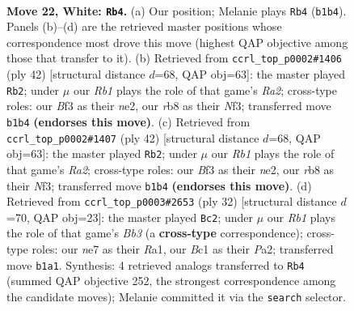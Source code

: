 \documentclass[11pt]{article}
\begin{document}
\clearpage

\begin{figure}[p]\centering
\begin{subfigure}{0.46\textwidth}\centering
\resizebox{\linewidth}{!}{%
\newchessgame
\chessboard[
  setfen={1rb2r1k/p3np2/1p2pnpp/2P5/2P5/N3PB1P/P4PP1/1RB1R1K1 w - - 2 22},
  showmover=false,
  pgfstyle=straightmove, color=movearrow, markmove={b1-b4}
]}
\caption{}
\end{subfigure}\hfill
\begin{subfigure}{0.46\textwidth}\centering
\resizebox{\linewidth}{!}{%
\newchessgame
\chessboard[
  setfen={r1b1k2r/pp3ppp/2p1p3/1P4B1/1b1P4/4PN2/R1B1nPPP/5R1K w kq - 7 22},
  showmover=false,
  pgfstyle=straightmove, color=movearrow, markmove={a2-b2}
]}
\caption{}
\end{subfigure}
\\[4pt]
\begin{subfigure}{0.46\textwidth}\centering
\resizebox{\linewidth}{!}{%
\newchessgame
\chessboard[
  setfen={r1b1k2r/pp3ppp/2p1p3/1P4B1/1b1P4/4PN2/R1B1nPPP/5R1K w kq - 7 22},
  showmover=false,
  pgfstyle=straightmove, color=movearrow, markmove={a2-b2}
]}
\caption{}
\end{subfigure}\hfill
\begin{subfigure}{0.46\textwidth}\centering
\resizebox{\linewidth}{!}{%
\newchessgame
\chessboard[
  setfen={r1b2rk1/1pp1bpp1/p6p/n3p3/4P3/1BP3N1/PP3PPP/R1BR2K1 w - - 1 17},
  showmover=false,
  pgfstyle=straightmove, color=movearrow, markmove={b3-c2}
]}
\caption{}
\end{subfigure}
\caption{\textbf{Move 22, White: \texttt{Rb4}.} (a) Our position; Melanie plays \texttt{Rb4} (\texttt{b1b4}). Panels (b)--(d) are the retrieved master positions whose correspondence most drove this move (highest QAP objective among those that transfer to it). (b) Retrieved from \texttt{ccrl\_top\_p0002\#1406} (ply 42) [structural distance $d$=68, QAP obj=63]: the master played \texttt{Rb2}; under $\mu$ our \emph{Rb1} plays the role of that game's \emph{Ra2}; cross-type roles: our \emph{B}f3 as their \emph{n}e2, our \emph{r}b8 as their \emph{N}f3; transferred move \texttt{b1b4} \textbf{(endorses this move)}. (c) Retrieved from \texttt{ccrl\_top\_p0002\#1407} (ply 42) [structural distance $d$=68, QAP obj=63]: the master played \texttt{Rb2}; under $\mu$ our \emph{Rb1} plays the role of that game's \emph{Ra2}; cross-type roles: our \emph{B}f3 as their \emph{n}e2, our \emph{r}b8 as their \emph{N}f3; transferred move \texttt{b1b4} \textbf{(endorses this move)}. (d) Retrieved from \texttt{ccrl\_top\_p0003\#2653} (ply 32) [structural distance $d$=70, QAP obj=23]: the master played \texttt{Bc2}; under $\mu$ our \emph{Rb1} plays the role of that game's \emph{Bb3} (a \textbf{cross-type} correspondence); cross-type roles: our \emph{n}e7 as their \emph{R}a1, our \emph{B}c1 as their \emph{P}a2; transferred move \texttt{b1a1}. Synthesis: 4 retrieved analogs transferred to \texttt{Rb4} (summed QAP objective 252, the strongest correspondence among the candidate moves); Melanie committed it via the \texttt{search} selector.}
\label{fig:thought-m42}
\end{figure}
\end{document}
